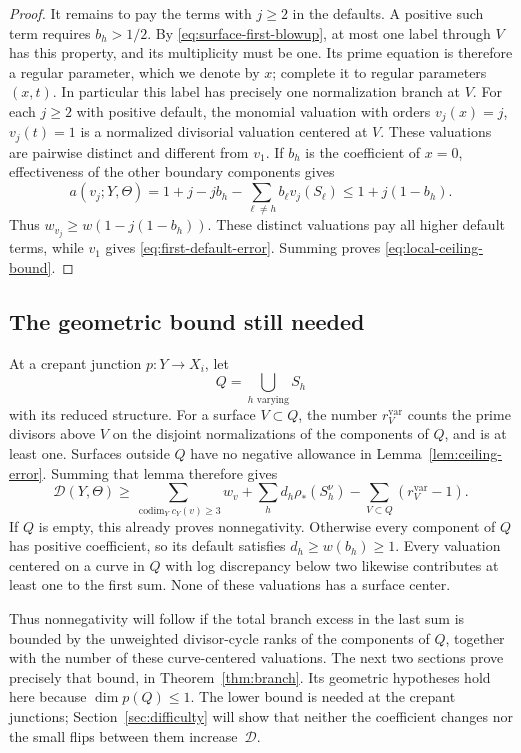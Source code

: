 \begin{proof}
It remains to pay the terms with \(j\geq2\) in the defaults.
A positive such term requires \(b_h>1/2\).  By
\eqref{eq:surface-first-blowup}, at most one label through \(V\)
has this property, and its multiplicity must be one.  Its prime
equation is therefore a regular parameter, which we denote by \(x\);
complete it to regular parameters \((x,t)\).  In particular this
label has precisely one normalization branch at \(V\).
For each \(j\geq2\) with positive default, the monomial valuation
with orders \(v_j(x)=j\), \(v_j(t)=1\) is a normalized divisorial
valuation centered at \(V\).  These valuations are pairwise distinct
and different from \(v_1\).  If \(b_h\) is the coefficient of
\(x=0\), effectiveness of the other boundary components gives
\[
 a(v_j;Y,\Theta)
 =1+j-jb_h-\sum_{\ell\ne h}b_\ell v_j(S_\ell)
 \leq1+j(1-b_h).
\]
Thus \(w_{v_j}\geq w(1-j(1-b_h))\).  These distinct valuations
pay all higher default terms, while \(v_1\) gives
\eqref{eq:first-default-error}.  Summing proves
\eqref{eq:local-ceiling-bound}.
\end{proof}


\subsection{The geometric bound still needed}

At a crepant junction $p:Y\to X_i$, let
\[
 Q=\bigcup_{h\text{ varying}}S_h
\]
with its reduced structure.  For a surface $V\subset Q$, the number
$r_V^{\mathrm{var}}$ counts the prime divisors above $V$ on the disjoint
normalizations of the components of $Q$, and is at least one.
Surfaces outside $Q$ have no negative allowance in
Lemma~\ref{lem:ceiling-error}.  Summing that lemma therefore gives
\begin{equation}\label{eq:difficulty-local-deficit}
 \mathcal D(Y,\Theta)\geq
 \sum_{\operatorname{codim}_Y c_Y(v)\geq3}w_v
 +\sum_h d_h\rho_*(S_h^\nu)
 -\sum_{V\subset Q}(r_V^{\mathrm{var}}-1).
\end{equation}
If $Q$ is empty, this already proves nonnegativity.  Otherwise every
component of $Q$ has positive coefficient, so its default satisfies
$d_h\geq w(b_h)\geq1$.  Every valuation centered on a curve in $Q$
with log discrepancy below two likewise contributes at least one to
the first sum.  None of these valuations has a surface center.

Thus nonnegativity will follow if the total branch excess in the last
sum is bounded by the unweighted divisor-cycle ranks of the components
of $Q$, together with the number of these curve-centered valuations.
The next two sections prove precisely that bound, in
Theorem~\ref{thm:branch}.  Its geometric hypotheses hold here because
$\dim p(Q)\leq1$.  The lower bound is needed at the crepant junctions;
Section~\ref{sec:difficulty} will show that neither the coefficient
changes nor the small flips between them increase~$\mathcal D$.
